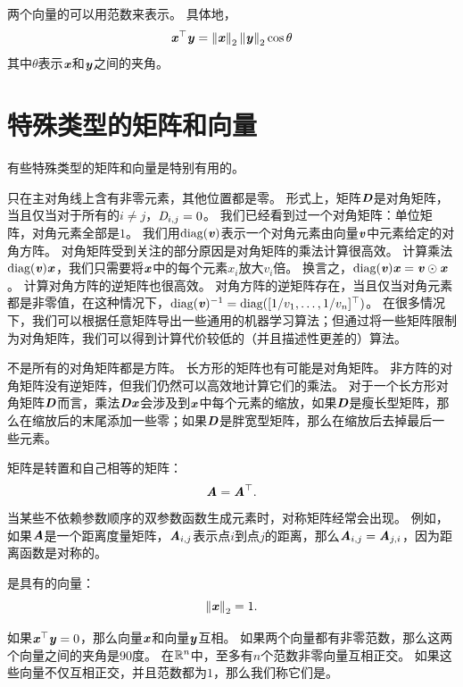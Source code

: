 两个向量的可以用范数来表示。
具体地，
\begin{equation}
    \Vx^\top\Vy = \norm{\Vx}_2\norm{\Vy}_2 \cos \theta
\end{equation}
其中$\theta$表示$\Vx$和$\Vy$之间的夹角。




\section{特殊类型的矩阵和向量}
\label{sec:special_kinds_of_matrices_and_vectors}

有些特殊类型的矩阵和向量是特别有用的。


只在主对角线上含有非零元素，其他位置都是零。
形式上，矩阵$\MD$是对角矩阵，当且仅当对于所有的$i\neq j$，$\SD_{i,j}=0$。
我们已经看到过一个对角矩阵：单位矩阵，对角元素全部是$1$。
我们用$\text{diag}(\Vv)$表示一个对角元素由向量$\Vv$中元素给定的对角方阵。
对角矩阵受到关注的部分原因是对角矩阵的乘法计算很高效。
计算乘法$\text{diag}(\Vv)\Vx$，我们只需要将$\Vx$中的每个元素$x_i$放大$v_i$倍。
换言之，$\text{diag}(\Vv)\Vx=\Vv \odot \Vx$。
计算对角方阵的逆矩阵也很高效。
对角方阵的逆矩阵存在，当且仅当对角元素都是非零值，在这种情况下，$\text{diag}(\Vv)^{-1}=\text{diag}([1/v_1,\dots,1/v_n]^\top)$。
在很多情况下，我们可以根据任意矩阵导出一些通用的机器学习算法；但通过将一些矩阵限制为对角矩阵，我们可以得到计算代价较低的（并且描述性更差的）算法。


不是所有的对角矩阵都是方阵。
长方形的矩阵也有可能是对角矩阵。
非方阵的对角矩阵没有逆矩阵，但我们仍然可以高效地计算它们的乘法。
对于一个长方形对角矩阵$\MD$而言，乘法$\MD\Vx$会涉及到$\Vx$中每个元素的缩放，如果$\MD$是瘦长型矩阵，那么在缩放后的末尾添加一些零；如果$\MD$是胖宽型矩阵，那么在缩放后去掉最后一些元素。



矩阵是转置和自己相等的矩阵：
\begin{equation}
    \MA=\MA^\top.
\end{equation}
当某些不依赖参数顺序的双参数函数生成元素时，对称矩阵经常会出现。
例如，如果$\MA$是一个距离度量矩阵，$\MA_{i,j}$表示点$i$到点$j$的距离，那么$\MA_{i,j}=\MA_{j,i}$，因为距离函数是对称的。


是具有的向量：
\begin{equation}
\norm{\Vx}_2=1.
\end{equation}


如果$\Vx^\top \Vy = 0$，那么向量$\Vx$和向量$\Vy$互相。
如果两个向量都有非零范数，那么这两个向量之间的夹角是$90$度。
在$\SetR^n$中，至多有$n$个范数非零向量互相正交。
如果这些向量不仅互相正交，并且范数都为$1$，那么我们称它们是。


